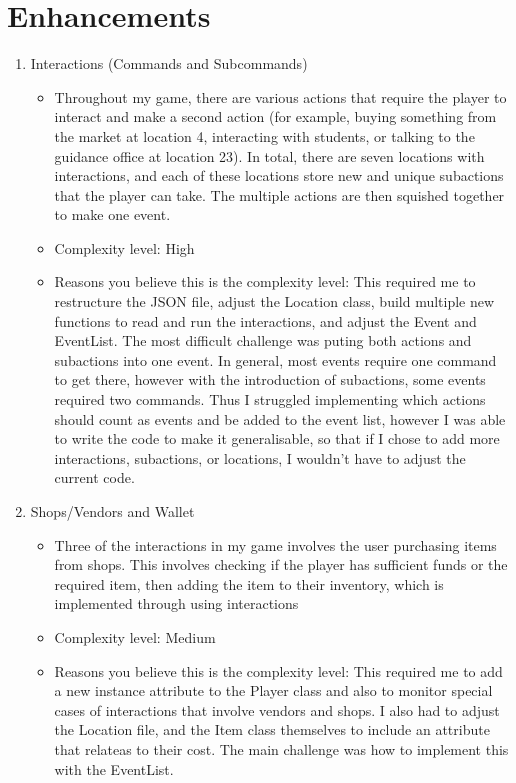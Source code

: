 \documentclass[11pt]{article}
\begin{document}
\section*{Enhancements}
\begin{enumerate}
    \item Interactions (Commands and Subcommands)
    \begin{itemize}
        \item Throughout my game, there are various actions that require the player to interact and make a second action (for example, buying something from the market at location 4, interacting with students, or talking to the guidance office at location 23). In total, there are seven locations with interactions, and each of these locations store new and unique subactions that the player can take. The multiple actions are then squished together to make one event.
        \item Complexity level: High
        \item Reasons you believe this is the complexity level: \newline
        This required me to restructure the JSON file, adjust the Location class, build multiple new functions to read and run the interactions, and adjust the Event and EventList. The most difficult challenge was puting both actions and subactions into one event. In general, most events require one command to get there, however with the introduction of subactions, some events required two commands. Thus I struggled implementing which actions should count as events and be added to the event list, however I was able to write the code to make it generalisable, so that if I chose to add more interactions, subactions, or locations, I wouldn't have to adjust the current code.
    \end{itemize}
    \item Shops/Vendors and Wallet
    \begin{itemize}
        \item Three of the interactions in my game involves the user purchasing items from shops. This involves checking if the player has sufficient funds or the required item, then adding the item to their inventory, which is implemented through using interactions
        \item Complexity level: Medium
        \item Reasons you believe this is the complexity level: \newline
        This required me to add a new instance attribute to the Player class and also to monitor special cases of interactions that involve vendors and shops. I also had to adjust the Location file, and the Item class themselves to include an attribute that relateas to their cost. The main challenge was how to implement this with the EventList.

\end{itemize}
\end{enumerate}
\end{document}
